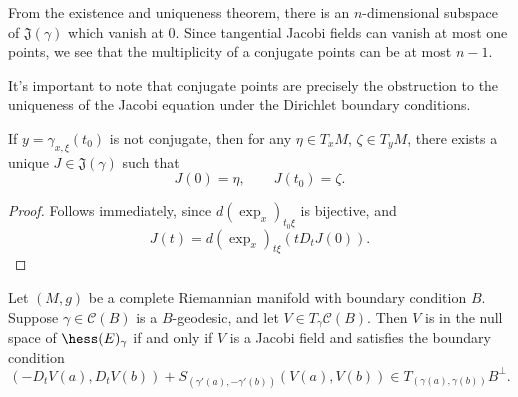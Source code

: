 From the existence and uniqueness theorem, there is an $n$-dimensional subspace of $\mathfrak{J}(\gamma)$ which vanish at $0$.  Since tangential Jacobi fields can vanish at most one points, we see that the multiplicity of a conjugate points can be at most $n-1$.

It's important to note that conjugate points are precisely the obstruction to the uniqueness of the Jacobi equation under the Dirichlet boundary conditions.  

\begin{cor}
    If $y=\gamma_{x,\xi}(t_0)$ is not conjugate, then for any $\eta\in T_xM$, $\zeta\in T_yM$, there exists a unique $J\in\mathfrak{J}(\gamma)$ such that
    $$J(0)=\eta,\qquad J(t_0)=\zeta.$$
\end{cor}

\begin{proof}
Follows immediately, since $d(\exp_x)_{t_0\xi}$ is bijective, and
$$J(t)=d(\exp_x)_{t\xi}(tD_tJ(0)).$$
\end{proof}

\begin{thm}
    Let $(M,g)$ be a complete Riemannian manifold with boundary condition $B$.  Suppose $\gamma\in\mathcal{C}(B)$ is a $B$-geodesic, and let $V\in T_\gamma\mathcal{C}(B)$.  Then $V$ is in the null space of $\hess(E)_\gamma$ if and only if $V$ is a Jacobi field and satisfies the boundary condition
\begin{equation}\label{eq:jacobiBC}
(-D_tV(a),D_tV(b))+S_{(\gamma'(a),-\gamma'(b))}(V(a),V(b))\in T_{(\gamma(a),\gamma(b))}B^\perp.
\end{equation}
\end{thm}

